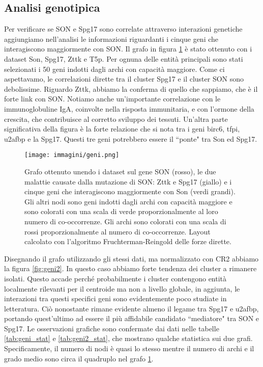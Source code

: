 \documentclass[12pt]{report}
\newcommand{\quotes}[1]{``#1"}
\begin{document}
\subsection{Analisi genotipica \label{genotipiche_son_spg17}}

Per verificare se SON e Spg17 sono correlate attraverso interazioni genetiche aggiungiamo nell'analisi le informazioni riguardanti i cinque geni che interagiscono maggiormente con SON. Il grafo in figura \ref{fig:geni} è stato ottenuto con i dataset Son, Spg17, Zttk e T5p. Per ognuna delle entità principali sono stati selezionati i 50 geni indotti dagli archi con capacità maggiore. Come ci aspettavamo, le correlazioni dirette tra il cluster Spg17 e il cluster SON sono debolissime. Riguardo Zttk, 
abbiamo la conferma di quello che sappiamo, che è il forte link con SON. Notiamo anche un'importante correlazione con le immunoglobuline IgA, coinvolte nella risposta immunitaria, e con l'ormone della crescita, che contribuisce al corretto sviluppo dei tessuti. %
Un'altra parte significativa della figura è la forte relazione che si nota tra i geni birc6, tfpi, u2afbp e la Spg17. Questi tre geni potrebbero essere il \quotes{ponte} tra Son ed Spg17.

\begin{figure}[!htb]
\centering
\texttt{[image: immagini/geni.png]}
\caption{\footnotesize{Grafo ottenuto unendo i dataset sul gene SON (rosso), le due malattie causate dalla mutazione di SON: Zttk e Spg17 (giallo) e i cinque geni che interagiscono maggiormente con Son (verdi grandi). Gli altri nodi sono geni indotti dagli archi con capacità maggiore e sono colorati con una scala di verde proporzionalmente al loro numero di co-occorrenze. Gli archi sono colorati con una scala di rossi proporzionalmente al numero di co-occorrenze. Layout calcolato con l'algoritmo Fruchterman-Reingold delle forze dirette.}}
\label{fig:geni}
\end{figure}

Disegnando il grafo utilizzando gli stessi dati, ma normalizzato con CR2 abbiamo la figura \ref{fig:geni2}. In questo caso abbiamo forte tendenza dei cluster a rimanere isolati. Questo accade perché probabilmente i cluster contengono entità localmente rilevanti per il centroide ma non a livello globale, in aggiunta, le interazioni tra questi specifici geni sono evidentemente poco studiate in letteratura. Ciò nonostante rimane evidente almeno il legame tra Spg17 e u2afbp, portando quest'ultimo ad essere il più affidabile candidato \quotes{mediatore} tra SON e Spg17. Le osservazioni grafiche sono confermate dai dati nelle tabelle \ref{tab:geni_stat} e \ref{tab:geni2_stat}, che mostrano qualche statistica sui due grafi. Specificamente, il numero di nodi è quasi lo stesso mentre il numero di archi e il grado medio sono circa il quadruplo nel grafo \ref{fig:geni}.
\end{document}
